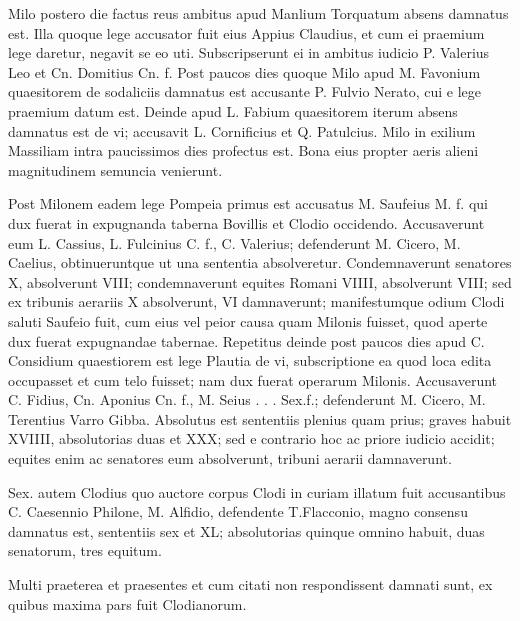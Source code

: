Milo postero die factus reus ambitus apud Manlium Torquatum absens damnatus est. Illa quoque lege accusator fuit eius Appius Claudius, et cum ei praemium lege daretur, negavit se eo uti. Subscripserunt ei in ambitus iudicio P. Valerius Leo et Cn. Domitius Cn. f. Post paucos dies quoque Milo apud M. Favonium quaesitorem de sodaliciis damnatus est accusante P. Fulvio Nerato, cui e lege praemium datum est. Deinde apud L. Fabium quaesitorem iterum absens damnatus est de vi; accusavit L. Cornificius et Q. Patulcius. Milo in exilium Massiliam intra paucissimos dies profectus est. Bona eius propter aeris alieni magnitudinem semuncia venierunt.

Post Milonem eadem lege Pompeia primus est accusatus M. Saufeius M. f. qui dux fuerat in expugnanda taberna Bovillis et Clodio occidendo. Accusaverunt eum L. Cassius, L. Fulcinius C. f., C. Valerius; defenderunt M. Cicero, M. Caelius, obtinueruntque ut una sententia absolveretur. Condemnaverunt senatores X, absolverunt VIII; condemnaverunt equites Romani VIIII, absolverunt VIII; sed ex tribunis aerariis X absolverunt, VI damnaverunt; manifestumque odium Clodi saluti Saufeio fuit, cum eius vel peior causa quam Milonis fuisset, quod aperte dux fuerat expugnandae tabernae. Repetitus deinde post paucos dies apud C. Considium quaestiorem est lege Plautia de vi, subscriptione ea quod loca edita occupasset et cum telo fuisset; nam dux fuerat operarum Milonis. Accusaverunt C. Fidius, Cn. Aponius Cn. f., M. Seius . . . Sex.f.; defenderunt M. Cicero, M. Terentius Varro Gibba. Absolutus est sententiis plenius quam prius; graves habuit XVIIII, absolutorias duas et XXX; sed e contrario hoc ac priore iudicio accidit; equites enim ac senatores eum absolverunt, tribuni aerarii damnaverunt.

Sex. autem Clodius quo auctore corpus Clodi in curiam illatum fuit accusantibus C. Caesennio Philone, M. Alfidio, defendente T.Flacconio, magno consensu damnatus est, sententiis sex et XL; absolutorias quinque omnino habuit, duas senatorum, tres equitum.

Multi praeterea et praesentes et cum citati non respondissent damnati sunt, ex quibus maxima pars fuit Clodianorum.


